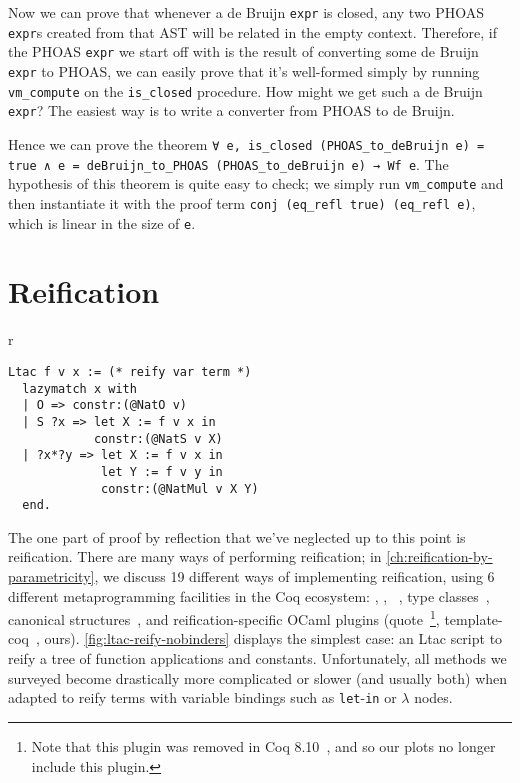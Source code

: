 Now we can prove that whenever a de Bruijn \texttt{expr} is closed, any two PHOAS \texttt{expr}s created from that AST will be related in the empty context.
Therefore, if the PHOAS \texttt{expr} we start off with is the result of converting some de Bruijn \texttt{expr} to PHOAS, we can easily prove that it's well-formed simply by running \texttt{vm_compute} on the \texttt{is_closed} procedure.
How might we get such a de Bruijn \texttt{expr}?
The easiest way is to write a converter from PHOAS to de Bruijn.

Hence we can prove the theorem \texttt{∀ e, is\_closed (PHOAS\_to\_deBruijn e) = true ∧ e = deBruijn\_to\_PHOAS (PHOAS\_to\_deBruijn e) → Wf e}.
The hypothesis of this theorem is quite easy to check; we simply run \texttt{vm_compute} and then instantiate it with the proof term \texttt{conj (eq_refl true) (eq_refl e)}, which is linear in the size of \texttt{e}.

\section{Reification}\label{sec:reif-survey}\label{sec:reif-intro}


\begin{wrapfigure}[14]{r}{}
\begin{verbatim}
Ltac f v x := (* reify var term *)
  lazymatch x with
  | O => constr:(@NatO v)
  | S ?x => let X := f v x in
            constr:(@NatS v X)
  | ?x*?y => let X := f v x in
             let Y := f v y in
             constr:(@NatMul v X Y)
  end.
\end{verbatim}
\caption{Reification Without Binders in~\Ltac}\label{fig:ltac-reify-nobinders}
\end{wrapfigure}

The one part of proof by reflection that we've neglected up to this point is reification.
There are many ways of performing reification; in \autoref{ch:reification-by-parametricity}, we discuss 19 different ways of implementing reification, using 6 different metaprogramming facilities in the Coq ecosystem: \Ltac, \LtacTwo, \MtacTwo~\cite{lessadhoc,Mtac2}, type classes~\cite{sozeau2008first}, canonical structures~\cite{gonthier2016small}, and reification-specific OCaml plugins (quote~\cite{quote-plugin}\footnote{Note that this plugin was removed in Coq 8.10~\cite{coq-pr-remove-quote-plugin}, and so our plots no longer include this plugin.}, template-coq~\cite{TemplateCoq}, ours).
%
\autoref{fig:ltac-reify-nobinders} displays the simplest case: an Ltac script to reify a tree of function applications and constants.
Unfortunately, all methods we surveyed become drastically more complicated or slower (and usually both) when adapted to reify terms with variable bindings such as \texttt{let}-\texttt{in} or \texttt{$\lambda$} nodes.


